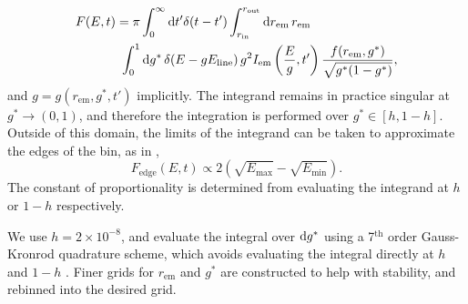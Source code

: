\begin{align}
    \label{eq:transfer-integration}
    F(E, t) &=
    \pi
    \int_0^\infty \text{d} t^\prime \delta(t - t^\prime)
    \int_{r_\text{in}}^{r_\text{out}} \text{d} r_\text{em}\,r_\text{em} \nonumber \\
    &\ \int_0^1 \text{d} g^\ast\, \delta(E - gE_\text{line})\, g^2 I_\text{em}\left(\frac{E}{g}, t^\prime\right) \frac{f(r_\text{em}, g^\ast)}{\sqrt{g^\ast (1 - g^\ast)}},
\end{align}
\noindent and $g = g( r_\text{em}, g^\ast, t')$ implicitly. The integrand remains in practice singular at $g^\ast \rightarrow (0, 1)$, and therefore the integration is performed over $g^\ast \in [h, 1 - h]$. Outside of this domain, the limits of the integrand can be taken to approximate the edges of the bin, as in \cite{dauser_broad_2010},
\begin{equation}
   F_\text{edge}(E,t) \propto 2\left( \sqrt{E_\text{max}} - \sqrt{E_\text{min}} \right).
\end{equation}
The constant of proportionality is determined from evaluating the integrand at $h$ or $1 - h$ respectively.

We use $h = 2 \times 10^{-8}$, and evaluate the integral over $\text{d} g^\ast$ using a 7$^\text{th}$ order Gauss-Kronrod quadrature scheme, which avoids evaluating the integral directly at $h$ and $1 - h$ \citep{}. Finer grids for $r_\text{em}$ and $g^\ast$ are constructed to help with stability, and rebinned into the desired grid. 

